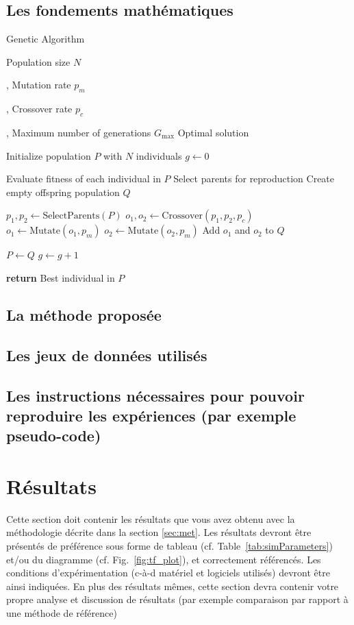 \documentclass[journal, a4paper]{IEEEtran}
\begin{document}
	\subsection{Les fondements mathématiques}

	\begin{algorithm}
  \caption{Genetic Algorithm}\label{alg:ga}
  \begin{algorithmic}
    \Require Population size $N$

	, Mutation rate $p_m$

	, Crossover rate $p_c$

	, Maximum number of generations $G_{\max}$
    \Ensure Optimal solution

    \State Initialize population $P$ with $N$ individuals
    \State $g \gets 0$

      \State Evaluate fitness of each individual in $P$
      \State Select parents for reproduction
      \State Create empty offspring population $Q$

        \State $p_1, p_2 \gets \text{SelectParents}(P)$
        \State $o_1, o_2 \gets \text{Crossover}(p_1, p_2, p_c)$
        \State $o_1 \gets \text{Mutate}(o_1, p_m)$
        \State $o_2 \gets \text{Mutate}(o_2, p_m)$
        \State Add $o_1$ and $o_2$ to $Q$
      \EndWhile

      \State $P \gets Q$
      \State $g \gets g + 1$
    \EndWhile

    \State \textbf{return} Best individual in $P$
  \end{algorithmic}
\end{algorithm}


	\subsection{La méthode proposée}
	\subsection{Les jeux de données utilisés}
	\subsection{Les instructions nécessaires pour pouvoir reproduire les expériences (par exemple pseudo-code)}



\section{Résultats}
	Cette section doit contenir les résultats que vous avez obtenu avec la méthodologie décrite dans la section \ref{sec:met}.
	Les résultats devront être présentés de préférence sous forme de tableau (cf. Table~\ref{tab:simParameters}) et/ou du diagramme (cf. Fig.~\ref{fig:tf_plot}), et correctement référencés.
	Les conditions d'expérimentation (c-à-d matériel et logiciels utilisés) devront être ainsi indiquées.
	En plus des résultats mêmes, cette section devra contenir votre propre analyse et discussion de résultats (par exemple comparaison par rapport à une méthode de référence)
\end{document}
